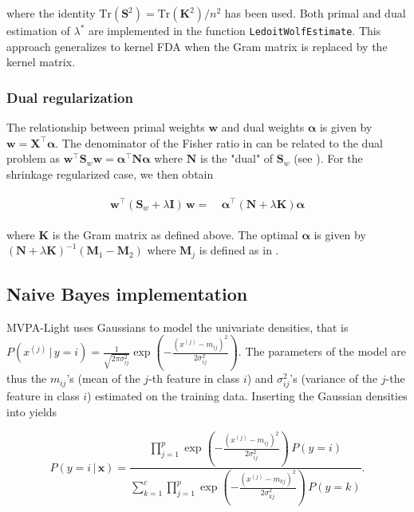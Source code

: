 \documentclass[utf8]{frontiersSCNS} %
\newcommand{\al}{\boldsymbol{\alpha}}
\newcommand{\mf}[2]{m_{#1#2}}
\newcommand{\sig}[2]{\sigma_{#1#2}^2}
\newcommand{\w}{\mathbf{w}}
\newcommand{\x}{\mathbf{x}}
\newcommand{\xf}[1]{x^{(#1)}} %
\newcommand{\I}{\mathbf{I}}
\newcommand{\K}{\mathbf{K}}
\newcommand{\M}{\mathbf{M}}
\renewcommand{\S}{\mathbf{S}}
\newcommand{\Tr}[1]{\text{Tr}(#1)}
\newcommand{\X}{\mathbf{X}}
\newcommand{\ttt}[1]{\texttt{#1}}
\begin{document}
where the identity $\Tr{\S^2} = \Tr{\K^2}/n^2$ has been used. Both primal and dual estimation of $\lambda^*$ are implemented in the function \ttt{LedoitWolfEstimate}. This approach generalizes to kernel FDA when the Gram matrix is replaced by the kernel matrix.


\subsubsection{Dual regularization}

The relationship between primal weights $\w$ and dual weights $\al$ is given by $\w = \X^\top\al$. The denominator of the Fisher ratio in  can be related to the dual problem as $\w^\top\S_w\w = \al^\top\mathbf{N}\al$ where $\mathbf{N}$ is the "dual" of $\S_w$ (see ). For the shrinkage regularized case, we then obtain

\begin{align}
\begin{split}
\label{eq:dualLDA}
\w^\top(\S_w + \lambda\I)\,\w =&\ \al^\top(\mathbf{N} + \lambda\K)\al
\end{split}
\end{align}

where $\K$ is the Gram matrix as defined above. The optimal $\al$ is given by $(\mathbf{N} + \lambda\K)^{-1}(\M_1 - \M_2)$ where $\M_j$ is defined as in .

\subsection{Naive Bayes implementation}\label{sec:naive_bayes_implementation}

MVPA-Light uses Gaussians to model the univariate densities, that is $P(\xf{j}\,|\,y = i) = \frac{1}{\sqrt{2\pi\sig{i}{j}}} \exp(-\frac{(\xf{j} - \mf{i}{j})^2}{2\sig{i}{j}})$. The parameters of the model are thus the $\mf{i}{j}$'s (mean of the $j$-th feature in class $i$) and $\sig{i}{j}$'s (variance of the $j$-the feature in class $i$) estimated on the training data. Inserting the Gaussian densities into  yields

\begin{equation}
\label{eq:naive_bayes_gaussian}
P(y = i\,|\,\x) = \frac{\prod_{j=1}^p \exp(-\frac{(\xf{j} - \mf{i}{j})^2}{2\sig{i}{j}})\,P(y = i)}%
{\sum_{k=1}^c \prod_{j=1}^p \exp(-\frac{(\xf{j} - \mf{k}{j})^2}{2\sig{k}{j}})\,P(y = k)}.
\end{equation}
\end{document}
